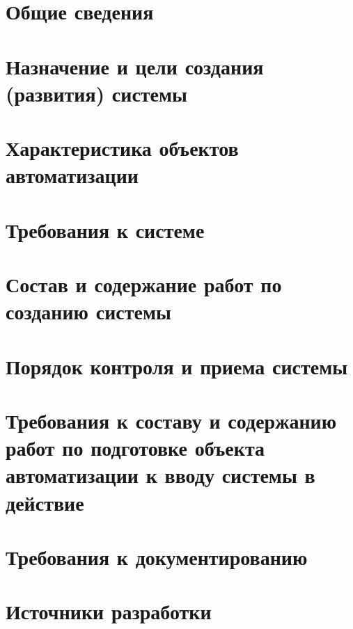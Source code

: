 

\titleformat{\section}{\normalfont\normalsize}{\thesection}{1.0em}{}
\titleformat{\subsection}{\normalfont\normalsize}{\thesubsection}{1.0em}{}
\titleformat{\subsubsection}{\normalfont\normalsize}{\thesubsubsection}{1.0em}{}

\newpage
\section{Общие сведения}


\section{Назначение и цели создания (развития) системы}


\section{Характеристика объектов автоматизации}


\section{Требования к системе}


\newpage
\section{Состав и содержание работ по созданию системы}


\section{Порядок контроля и приема системы}


\section{Требования к составу и содержанию работ по подготовке объекта автоматизации к вводу системы в действие}


\section{Требования к документированию}


\section{Источники разработки}


\newpage



\label{lastpage}
